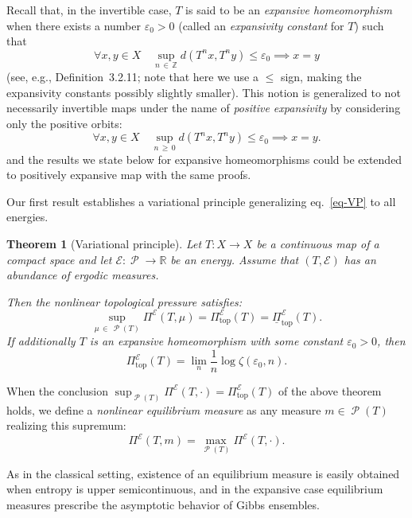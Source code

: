 \documentclass[10pt]{amsart}
\theoremstyle{definition}\newtheorem{defi}[theo]{Definition}\newtheorem{rema}[theo]{Remark}\newtheorem{exam}[theo]{Example}\newtheorem{exem}[theo]{Example}\newtheorem{nota}[theo]{Notation}
\theoremstyle{plain}
\newtheorem{theol}{Theorem}
\theoremstyle{plain}
\newcommand\eps{\varepsilon}
\newcommand\NLP{\Pi}
\renewcommand\top{{\mathrm{top}}}
\newcommand\Prob{{\operatorname{\mathscr{P}}}}
\newcommand*\8{\infty}
\newcommand\RR{\mathbb{R}}
\newcommand\ZZ{\mathbb{Z}}
\newcommand{\En}{\mathcal{E}}
\let\oldforall\forall
\renewcommand*{\forall}{\mathrel{\oldforall}}
\begin{document}
Recall that, in the invertible case, $T$ is said to be an \emph{expansive homeomorphism} when there exists a number $\eps_0>0$ (called an \emph{expansivity constant} for $T$) such that
\[
\forall x,y\in X\quad \sup_{n\,\in\,\ZZ} d\left(T^nx,T^ny\right)\leq\eps_0 \implies x=y
\]
(see, e.g., \cite{Katok-Hasselblatt} Definition~3.2.11; note that here we use a $\le$ sign, making the expansivity constants possibly slightly smaller). This notion is generalized to not necessarily invertible maps under the name of \emph{positive expansivity} by considering only the positive orbits:
\[
\forall x,y\in X\quad \sup_{n\,\ge\,0} d\left(T^nx,T^ny\right)\leq\eps_0 \implies x=y.
\]
and the results we state below for expansive homeomorphisms could be extended to positively expansive map with the same proofs.

Our first result establishes a variational principle generalizing eq.~\eqref{eq-VP} to all energies.


\begin{theol}[Variational principle]\label{thm-var-prin-NL}
Let $T:X\to X$ be a continuous map of a compact space and let $\En:\Prob\to\RR$ be an energy. Assume that $(T,\En)$ has an abundance of ergodic measures.


Then the nonlinear topological pressure satisfies:
\begin{equation}\label{eq-def-Ptop}
\sup_{\mu\,\in\,\Prob(T)} \NLP^\En(T,\mu) = \NLP^\En_\top(T) = \underline{\NLP}_\top^\En(T).
\end{equation}
If additionally $T$ is an expansive homeomorphism with some constant $\eps_0>0$, then
\begin{equation}\label{eq-ent-eps}
\NLP^\En_\top(T) =\lim_n \frac1n \log \zeta(\eps_0,n).
\end{equation}
\end{theol}



When the conclusion $\sup_{\Prob(T)} \NLP^\En(T,\cdot) = \NLP^\En_\top(T)$ of the above theorem holds, we define a \emph{nonlinear equilibrium measure} as any measure $m\in\Prob(T)$ realizing this supremum:
\[
\NLP^\En(T,m)=\max_{\Prob(T)} \NLP^\En(T,\cdot).
\]


As in the classical setting, existence of an equilibrium measure is easily obtained when entropy is upper semicontinuous, and in the expansive case equilibrium measures prescribe the asymptotic behavior of Gibbs ensembles.
\end{document}
